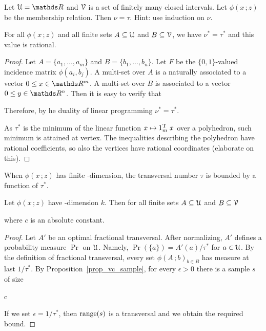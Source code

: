 \documentclass[scombinatorics.tex]{subfiles}
\begin{document}
\begin{exercise}
Let $\U=\RR$ and $\EuScript V$ is a set of finitely many closed intervals.
Let $\phi(x\,;z)$ be the membership relation.
Then $\nu=\tau$.
Hint: use induction on $\nu$.\QED
\end{exercise}

\begin{theorem}\label{thm_fractional_nu=tau}
 For all $\phi(x\,;z)$ and all finite sets $A\subseteq\EuScript U$ and $B\subseteq\EuScript V$, we have $\nu^*=\tau^*$ and this value is rational.
\end{theorem}
\begin{proof}
Let $A=\{a_1,\dots,a_m\}$ and $B=\{b_1,\dots,b_n\}$.
Let $F$ be the $\{0,1\}$-valued incidence matrix $\phi(a_i,b_j)$.
A multi-set over $A$ is a naturally associated to a vector $0\le x\in\RR^m$.
A multi-set over $B$ is associated to a vector $0\le y\in\RR^n$.
Then it is easy to verify that



Therefore, by he duality of linear programming $\nu^*=\tau^*$.

As $\tau^*$ is the minimum of the linear function $x\mapsto 1_m^{\rm T}\;x$ over a polyhedron, such minimum is attained at vertex.
The inequalities describing the polyhedron have rational coefficients, so also the vertices have rational coordinates (elaborate on this).
\end{proof}

When $\phi(x\,;z)$ has finite \vc-dimension, the transversal number $\tau$ is bounded by a function of $\tau^*$. 

\begin{proposition}\label{prop_bound_fractional_trans}
  Let $\phi(x\,;z)$ have \vc-dimension $k$.
  Then for all finite sets $A\subseteq\EuScript U$ and $B\subseteq\EuScript V$
  
  
  where $c$ is an absolute constant.
\end{proposition}
  
\begin{proof}
  Let $A'$ be an optimal fractional transversal.
  After normalizing, $A'$ defines a probability measure $\Pr$ on $\EuScript U$.
  Namely, $\Pr(\{a\})=A'(a)/\tau^*$ for $a\in\EuScript U$.
  By the definition of fractional transversal, every set $\phi(A\,;b)_{b\in B}$ has measure at last $1/\tau^*$.
  By Proposition~\ref{prop_vc_sample}, for every $\epsilon>0$ there is a sample $s$ of size
  
  {\le}
  {c\,\log{}}

  If we set $\epsilon=1/\tau^*$, then $\mathop{\rm range}(s)$ is a transversal and we obtain the required bound.
\end{proof}
\end{document}
